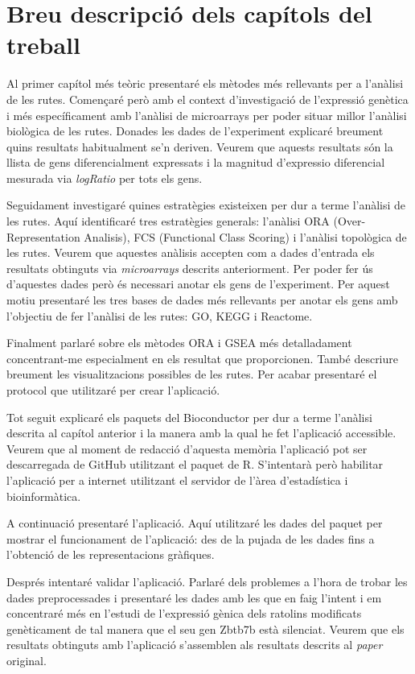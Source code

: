 \section{Breu descripció dels capítols del treball}

Al primer capítol més teòric presentaré els mètodes més rellevants per a l’anàlisi de les rutes. Començaré però amb el context d'investigació de l'expressió genètica i més específicament amb l'anàlisi de microarrays per poder situar millor l'anàlisi biològica de les rutes. Donades les dades de l'experiment explicaré breument quins resultats habitualment se’n deriven. Veurem que aquests resultats són la llista de gens diferencialment expressats i la magnitud d'expressio diferencial mesurada via \textit{\gls{logRatio}} per tots els gens. 

Seguidament investigaré quines estratègies existeixen per dur a terme l'anàlisi de les rutes. Aquí identificaré tres estratègies generals: l'anàlisi \gls{ORA} (Over-Representation Analisis), \gls{FCS} (Functional Class Scoring) i l'anàlisi topològica de les rutes. Veurem que aquestes anàlisis accepten com a dades d'entrada els resultats obtinguts via \textit{microarrays} descrits anteriorment. Per poder fer ús d'aquestes dades però és necessari anotar els gens de l'experiment. Per aquest motiu presentaré les tres bases de dades més rellevants per anotar els gens amb l’objectiu de fer l’anàlisi de les rutes: \gls{GO}, \gls{KEGG} i Reactome.

Finalment parlaré sobre els mètodes \gls{ORA} i \gls{GSEA} més detalladament concentrant-me especialment en els resultat que proporcionen. També descriure breument les visualitzacions possibles de les rutes. Per acabar presentaré el protocol que utilitzaré per crear l'aplicació.

Tot seguit explicaré els paquets del \gls{Bioconductor} per dur a terme l'anàlisi descrita al capítol anterior i la manera amb la qual he fet l'aplicació accessible. Veurem que al moment de redacció d'aquesta memòria l'aplicació pot ser descarregada de GitHub utilitzant el paquet  de R. S'intentarà però habilitar l'aplicació per a internet utilitzant el servidor de l'àrea d'estadística i bioinformàtica. 

A continuació presentaré l'aplicació. Aquí utilitzaré les dades del paquet  per mostrar el funcionament de l'aplicació: des de la pujada de les dades fins a l’obtenció de les representacions gràfiques.

Després intentaré validar l'aplicació. Parlaré dels problemes a l'hora de trobar les dades preprocessades i presentaré les dades amb les que en faig l’intent i em concentraré més en l'estudi de l'expressió gènica dels ratolins modificats genèticament de tal manera que el seu gen Zbtb7b està silenciat. Veurem que els resultats obtinguts amb l'aplicació s'assemblen als resultats descrits al \textit{paper} original. 


